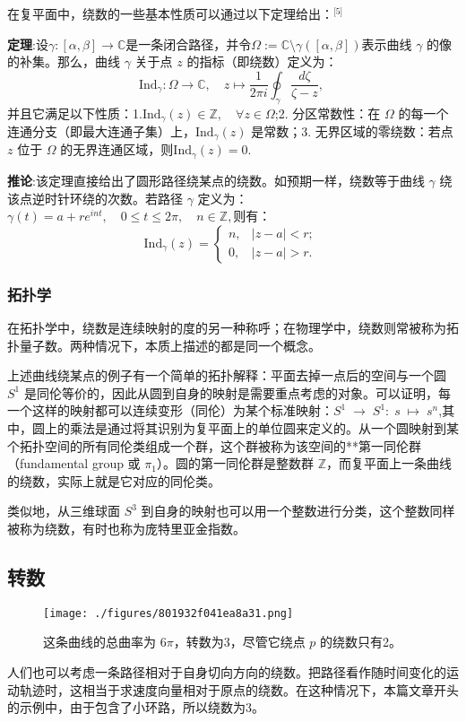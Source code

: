 在复平面中，绕数的一些基本性质可以通过以下定理给出：\(^\text{[5]}\)

\textbf{定理}:设$\gamma:[\alpha,\beta]\to\mathbb{C}$是一条闭合路径，并令$\Omega := \mathbb{C} \setminus \gamma([\alpha,\beta])$表示曲线 $\gamma$ 的像的补集。那么，曲线 $\gamma$ 关于点 $z$ 的指标（即绕数）定义为：
$$
\mathrm{Ind}_{\gamma}:\Omega\to\mathbb{C}, \quad 
z \mapsto 
\frac{1}{2\pi i}
\oint_{\gamma} 
\frac{d\zeta}{\zeta - z},~
$$
并且它满足以下性质：1.$\mathrm{Ind}_{\gamma}(z) \in \mathbb{Z}, \quad \forall z\in\Omega$;2. 分区常数性：在 $\Omega$ 的每一个连通分支（即最大连通子集）上，$\mathrm{Ind}_{\gamma}(z)$ 是常数；3. 无界区域的零绕数：若点 $z$ 位于 $\Omega$ 的无界连通区域，则$\mathrm{Ind}_{\gamma}(z) = 0$.

\textbf{推论}:该定理直接给出了圆形路径绕某点的绕数。如预期一样，绕数等于曲线 $\gamma$ 绕该点逆时针环绕的次数。若路径 $\gamma$ 定义为：$\gamma(t) = a + r e^{int}, \quad 0 \leq t \leq 2\pi, \quad n \in \mathbb{Z},$则有：
$$
\mathrm{Ind}_{\gamma}(z) =
\begin{cases}
n, & |z-a|<r;\\[6pt]
0, & |z-a|>r.
\end{cases}~
$$
\subsubsection{拓扑学}
在拓扑学中，绕数是连续映射的度的另一种称呼；在物理学中，绕数则常被称为拓扑量子数。两种情况下，本质上描述的都是同一个概念。

上述曲线绕某点的例子有一个简单的拓扑解释：平面去掉一点后的空间与一个圆 $S^1$ 是同伦等价的，因此从圆到自身的映射是需要重点考虑的对象。可以证明，每一个这样的映射都可以连续变形（同伦）为某个标准映射：$S^1 \;\to\; S^1: \; s \;\mapsto\; s^n$,其中，圆上的乘法是通过将其识别为复平面上的单位圆来定义的。从一个圆映射到某个拓扑空间的所有同伦类组成一个群，这个群被称为该空间的**第一同伦群（fundamental group 或 $\pi_1$）。圆的第一同伦群是整数群 $\mathbb{Z}$，而复平面上一条曲线的绕数，实际上就是它对应的同伦类。

类似地，从三维球面 $S^3$ 到自身的映射也可以用一个整数进行分类，这个整数同样被称为绕数，有时也称为庞特里亚金指数。
\subsection{转数}
\begin{figure}[ht]
\centering
\texttt{[image: ./figures/801932f041ea8a31.png]}
\caption{这条曲线的总曲率为 $6\pi$，转数为3，尽管它绕点 $p$ 的绕数只有2。} \label{fig_JRS_3}
\end{figure}
人们也可以考虑一条路径相对于自身切向方向的绕数。把路径看作随时间变化的运动轨迹时，这相当于求速度向量相对于原点的绕数。在这种情况下，本篇文章开头的示例中，由于包含了小环路，所以绕数为3。

